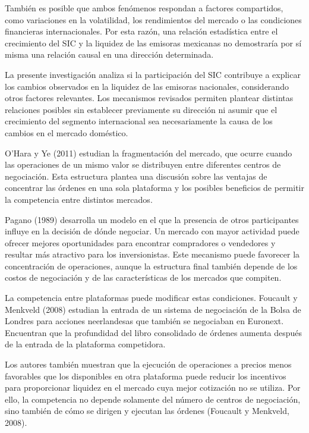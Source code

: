También es posible que ambos fenómenos respondan a factores compartidos, como variaciones en la volatilidad, los rendimientos del mercado o las condiciones financieras internacionales. Por esta razón, una relación estadística entre el crecimiento del SIC y la liquidez de las emisoras mexicanas no demostraría por sí misma una relación causal en una dirección determinada.

La presente investigación analiza si la participación del SIC contribuye a explicar los cambios observados en la liquidez de las emisoras nacionales, considerando otros factores relevantes. Los mecanismos revisados permiten plantear distintas relaciones posibles sin establecer previamente su dirección ni asumir que el crecimiento del segmento internacional sea necesariamente la causa de los cambios en el mercado doméstico.


O'Hara y Ye (2011) estudian la fragmentación del mercado, que ocurre cuando las operaciones de un mismo valor se distribuyen entre diferentes centros de negociación. Esta estructura plantea una discusión sobre las ventajas de concentrar las órdenes en una sola plataforma y los posibles beneficios de permitir la competencia entre distintos mercados.

Pagano (1989) desarrolla un modelo en el que la presencia de otros participantes influye en la decisión de dónde negociar. Un mercado con mayor actividad puede ofrecer mejores oportunidades para encontrar compradores o vendedores y resultar más atractivo para los inversionistas. Este mecanismo puede favorecer la concentración de operaciones, aunque la estructura final también depende de los costos de negociación y de las características de los mercados que compiten.

La competencia entre plataformas puede modificar estas condiciones. Foucault y Menkveld (2008) estudian la entrada de un sistema de negociación de la Bolsa de Londres para acciones neerlandesas que también se negociaban en Euronext. Encuentran que la profundidad del libro consolidado de órdenes aumenta después de la entrada de la plataforma competidora.

Los autores también muestran que la ejecución de operaciones a precios menos favorables que los disponibles en otra plataforma puede reducir los incentivos para proporcionar liquidez en el mercado cuya mejor cotización no se utiliza. Por ello, la competencia no depende solamente del número de centros de negociación, sino también de cómo se dirigen y ejecutan las órdenes (Foucault y Menkveld, 2008).

